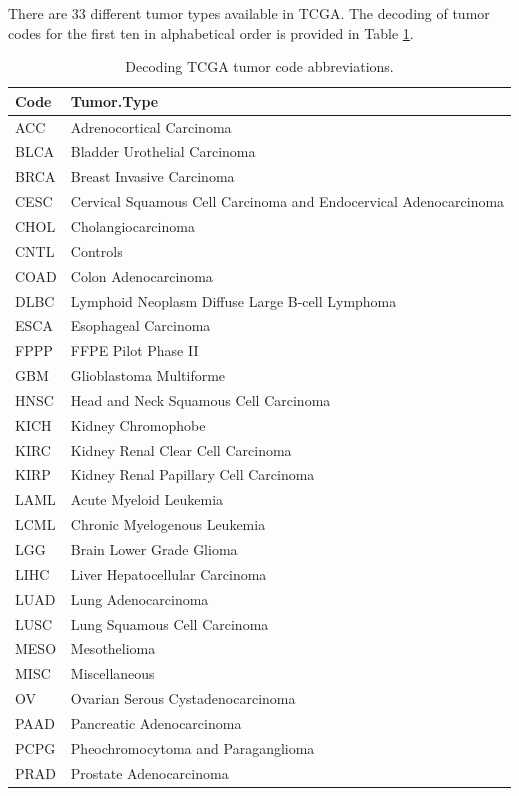 \documentclass[graybox]{svmult}
\begin{document}
There are 33 different tumor types available in TCGA. The
decoding of tumor codes for the first ten in alphabetical order is
provided in Table \ref{tab:tab-deco}.

\begin{table}

\caption{\label{tab:tab-deco}Decoding TCGA tumor code abbreviations.}
\centering
\begin{tabular}[t]{ll}
\toprule
Code & Tumor.Type\\
\midrule
ACC & Adrenocortical Carcinoma\\
BLCA & Bladder Urothelial Carcinoma\\
BRCA & Breast Invasive Carcinoma\\
CESC & Cervical Squamous Cell Carcinoma and Endocervical Adenocarcinoma\\
CHOL & Cholangiocarcinoma\\
\addlinespace
CNTL & Controls\\
COAD & Colon Adenocarcinoma\\
DLBC & Lymphoid Neoplasm Diffuse Large B-cell Lymphoma\\
ESCA & Esophageal Carcinoma\\
FPPP & FFPE Pilot Phase II\\
\addlinespace
GBM & Glioblastoma Multiforme\\
HNSC & Head and Neck Squamous Cell Carcinoma\\
KICH & Kidney Chromophobe\\
KIRC & Kidney Renal Clear Cell Carcinoma\\
KIRP & Kidney Renal Papillary Cell Carcinoma\\
\addlinespace
LAML & Acute Myeloid Leukemia\\
LCML & Chronic Myelogenous Leukemia\\
LGG & Brain Lower Grade Glioma\\
LIHC & Liver Hepatocellular Carcinoma\\
LUAD & Lung Adenocarcinoma\\
\addlinespace
LUSC & Lung Squamous Cell Carcinoma\\
MESO & Mesothelioma\\
MISC & Miscellaneous\\
OV & Ovarian Serous Cystadenocarcinoma\\
PAAD & Pancreatic Adenocarcinoma\\
\addlinespace
PCPG & Pheochromocytoma and Paraganglioma\\
PRAD & Prostate Adenocarcinoma\\

\end{tabular}
\end{table}
\end{document}
